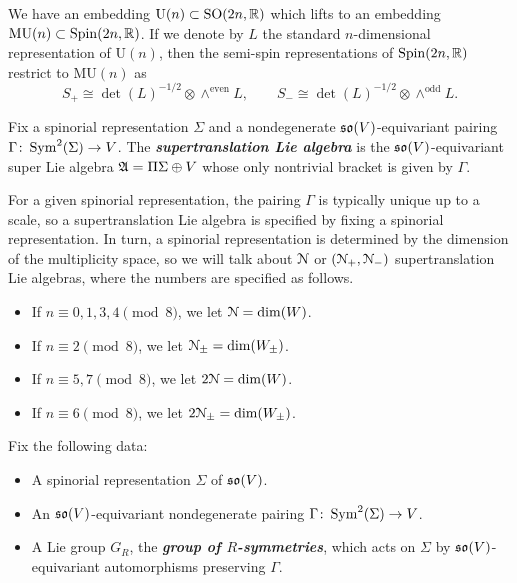 \documentclass[10pt, oneside]{article}
\newcommand{\MU}{\mathrm{MU}}
\renewcommand{\U}{\mathrm{U}}
\newcommand{\defterm}[1]{\textbf{\emph{#1}}}
\begin{document}
We have an embedding $\U(n)\subset \SO(2n, \RR)$ which lifts to an embedding $\MU(n)\subset \Spin(2n, \RR)$. If we denote by $L$ the standard $n$-dimensional representation of $\U(n)$, then the semi-spin representations of $\mathrm{Spin}(2n, \mathbb R)$ restrict to $\MU(n)$ as
\[S_+\cong \det(L)^{-1/2}\otimes \wedge^{\mathrm{even}} L,\qquad S_-\cong \det(L)^{-1/2}\otimes \wedge^{\mathrm{odd}} L.\]

\begin{definition}
Fix a spinorial representation $\Sigma$ and a nondegenerate $\mathfrak{so}(V)$-equivariant pairing $\Gamma\colon \operatorname{Sym}^2(\Sigma)\rightarrow V$. The \defterm{supertranslation Lie algebra} is the $\mathfrak{so}(V)$-equivariant super Lie algebra $\mathfrak A = \Pi\Sigma\oplus V$ whose only nontrivial bracket is given by $\Gamma$.
\end{definition}

For a given spinorial representation, the pairing $\Gamma$ is typically unique up to a scale, so a supertranslation Lie algebra is specified by fixing a spinorial representation. In turn, a spinorial representation is determined by the dimension of the multiplicity space, so we will talk about $\mathcal{N}$ or $(\mathcal{N}_+, \mathcal{N}_-)$ supertranslation Lie algebras, where the numbers are specified as follows.
\begin{itemize}
\item If $n\equiv 0, 1, 3, 4\pmod 8$, we let $\mathcal{N} = \dim(W)$.

\item If $n\equiv 2 \pmod 8$, we let $\mathcal{N}_{\pm}=\dim(W_{\pm})$.

\item If $n\equiv 5, 7\pmod 8$, we let $2\mathcal{N} = \dim(W)$.

\item If $n\equiv 6\pmod 8$, we let $2\mathcal{N}_{\pm} = \dim(W_{\pm})$.
\end{itemize}

Fix the following data:
\begin{itemize}
\item A spinorial representation $\Sigma$ of $\mathfrak{so}(V)$.

\item An $\mathfrak{so}(V)$-equivariant nondegenerate pairing $\Gamma\colon \operatorname{Sym}^2(\Sigma)\rightarrow V$.

\item A Lie group $G_R$, the \defterm{group of $R$-symmetries}, which acts on $\Sigma$ by $\mathfrak{so}(V)$-equivariant automorphisms preserving $\Gamma$.
\end{itemize}
\end{document}
